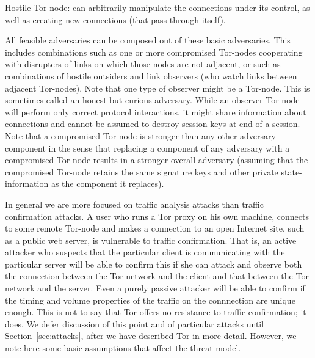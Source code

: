 \documentclass[times,10pt,twocolumn]{article}
\begin{document}
\begin{description}

  
\item{Hostile Tor node:} can arbitrarily manipulate the
  connections under its control, as well as creating new connections
  (that pass through itself).
\end{description}


All feasible adversaries can be composed out of these basic
adversaries. This includes combinations such as one or more
compromised Tor-nodes cooperating with disrupters of links on which
those nodes are not adjacent, or such as combinations of hostile
outsiders and link observers (who watch links between adjacent
Tor-nodes).  Note that one type of observer might be a Tor-node. This
is sometimes called an honest-but-curious adversary. While an observer
Tor-node will perform only correct protocol interactions, it might
share information about connections and cannot be assumed to destroy
session keys at end of a session.  Note that a compromised Tor-node is
stronger than any other adversary component in the sense that
replacing a component of any adversary with a compromised Tor-node
results in a stronger overall adversary (assuming that the compromised
Tor-node retains the same signature keys and other private
state-information as the component it replaces).


In general we are more focused on traffic analysis attacks than
traffic confirmation attacks. A user who runs a Tor proxy on his own
machine, connects to some remote Tor-node and makes a connection to an
open Internet site, such as a public web server, is vulnerable to
traffic confirmation. That is, an active attacker who suspects that
the particular client is communicating with the particular server will
be able to confirm this if she can attack and observe both the
connection between the Tor network and the client and that between the
Tor network and the server. Even a purely passive attacker will be
able to confirm if the timing and volume properties of the traffic on
the connnection are unique enough.  This is not to say that Tor offers
no resistance to traffic confirmation; it does.  We defer discussion
of this point and of particular attacks until Section~\ref{sec:attacks},
after we have described Tor in more detail. However, we note here some
basic assumptions that affect the threat model.
\end{document}
